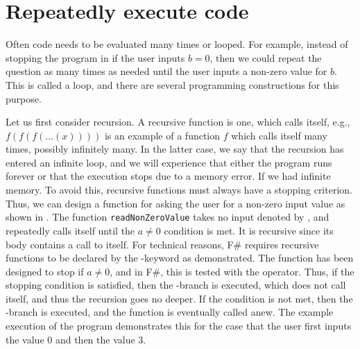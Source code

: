 \documentclass[fsharpNotes.tex]{subfiles}
\begin{document}
\section{Repeatedly execute code}
Often code needs to be evaluated many times or looped. For example, instead of stopping the program in  if the user inputs $b=0$, then we could repeat the question as many times as needed until the user inputs a non-zero value for $b$. This is called a loop, and there are several programming constructions for this purpose.

Let us first consider recursion. A recursive function is one, which calls itself, e.g., $f(f(f(\dots(x))))$ is an example of a function $f$ which calls itself many times, possibly infinitely many. In the latter case, we say that the recursion has entered an infinite loop, and we will experience that either the program runs forever or that the execution stops due to a memory error. If we had infinite memory. To avoid this, recursive functions must always have a stopping criterion. Thus, we can design a function for asking the user for a non-zero input value as shown in .
% 
%
The function \lstinline{readNonZeroValue} takes no input denoted by \lexeme{()}, and repeatedly calls itself until the $a\neq 0$ condition is met. It is recursive since its body contains a call to itself. For technical reasons, F\# requires recursive functions to be declared by the -keyword as demonstrated. The function has been designed to stop if $a\neq 0$, and in F\#, this is tested with the \lexeme{<>} operator. Thus, if the stopping condition is satisfied, then the -branch is executed, which does not call itself, and thus the recursion goes no deeper. If the condition is not met, then the -branch is executed, and the function is eventually called anew. The example execution of the program demonstrates this for the case that the user first inputs the value 0 and then the value 3.
\end{document}
